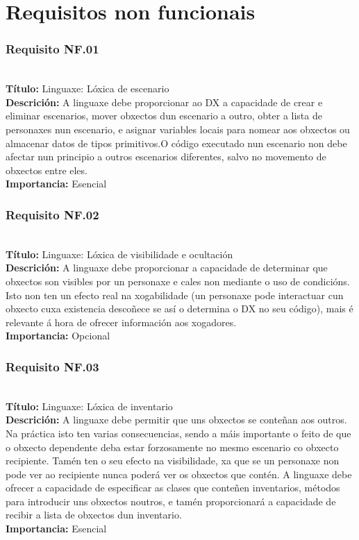 \section{Requisitos non funcionais}

\subsubsection{Requisito NF.01}~\\
{\bf Título:} Linguaxe: Lóxica de escenario\\
{\bf Descrición:} A linguaxe debe proporcionar ao DX a capacidade de crear e
eliminar escenarios, mover obxectos dun escenario a outro, obter a lista de
personaxes nun escenario, e asignar variables locais para nomear aos obxectos ou
almacenar datos de tipos primitivos.O código executado nun escenario non debe
afectar nun principio a outros escenarios diferentes, salvo no movemento de
obxectos entre eles.\\
{\bf Importancia:} Esencial

\subsubsection{Requisito NF.02}~\\
{\bf Título:} Linguaxe: Lóxica de visibilidade e ocultación\\
{\bf Descrición:} A linguaxe debe proporcionar a capacidade de determinar que
obxectos son visibles por un personaxe e cales non mediante o uso de
condicións. Isto non ten un efecto real na xogabilidade (un personaxe pode
interactuar cun obxecto cuxa existencia descoñece se así o determina o DX no
seu código), mais é relevante á hora de ofrecer información aos xogadores. \\
{\bf Importancia:} Opcional

\subsubsection{Requisito NF.03}~\\
{\bf Título:} Linguaxe: Lóxica de inventario\\
{\bf Descrición:} A linguaxe debe permitir que uns obxectos se conteñan aos
outros. Na práctica isto ten varias consecuencias, sendo a máis importante o
feito de que o obxecto dependente deba estar forzosamente no mesmo escenario co
obxecto recipiente. Tamén ten o seu efecto na visibilidade, xa que se un
personaxe non pode ver ao recipiente nunca poderá ver os obxectos que contén. A
linguaxe debe ofrecer a capacidade de especificar as clases que conteñen
inventarios, métodos para introducir uns obxectos noutros, e tamén proporcionará
a capacidade de recibir a lista de obxectos dun inventario.\\
{\bf Importancia:} Esencial

